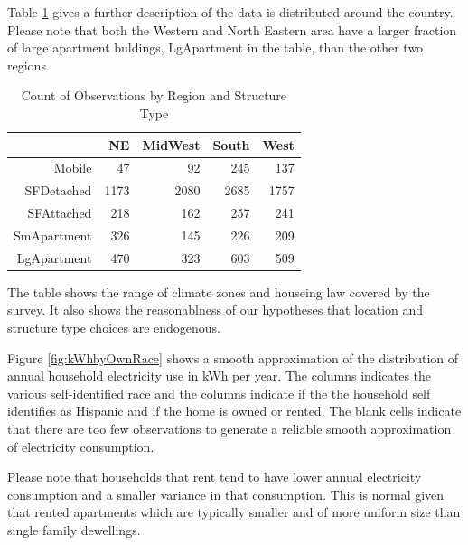 \documentclass{article}
\begin{document}
Table
\ref{tab:RegionVStruct}
gives a further description of the data is distributed around the country.  Please note that both the Western and North Eastern area have a larger fraction of large apartment buldings, LgApartment in the table, than the other two regions. 


\begin{table}[ht]
\centering
\caption{Count of Observations by Region and Structure Type} 
\label{tab:RegionVStruct}
{\small
\begin{tabular}{rrrrr}
  \hline
 & NE & MidWest & South & West \\ 
  \hline
Mobile &  47 &  92 & 245 & 137 \\ 
  SFDetached & 1173 & 2080 & 2685 & 1757 \\ 
  SFAttached & 218 & 162 & 257 & 241 \\ 
  SmApartment & 326 & 145 & 226 & 209 \\ 
  LgApartment & 470 & 323 & 603 & 509 \\ 
   \hline
\end{tabular}
}
\end{table}
The table shows the range of climate zones and houseing law covered by the survey.  It also shows the reasonablness of our hypotheses that location and structure type choices are endogenous.

Figure
\ref{fig:kWhbyOwnRace}
shows a smooth approximation of the distribution of annual household electricity use in kWh per year.  The columns indicates the various self-identified race and the columns indicate if the the household self identifies as Hispanic and if the home is owned or rented. The blank cells indicate that there are too few observations to generate a reliable smooth approximation of electricity consumption.

Please note that households that rent tend to have lower annual electricity consumption and a smaller variance in that consumption.  This is normal given that rented apartments which are typically smaller and of more uniform size than single family dewellings.  
\end{document}
